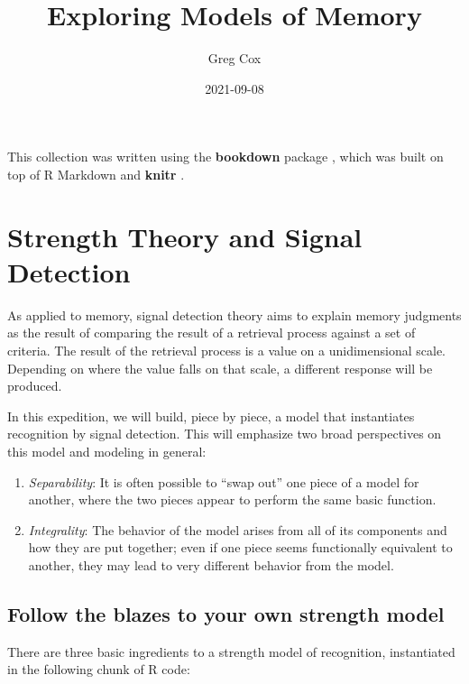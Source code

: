 \documentclass[
]{book}
\title{Exploring Models of Memory}
\author{Greg Cox}
\date{2021-09-08}
\providecommand{\tightlist}{%
  \setlength{\itemsep}{0pt}\setlength{\parskip}{0pt}}
\begin{document}
\maketitle

{
\setcounter{tocdepth}{1}
\tableofcontents
}
This collection was written using the \textbf{bookdown} package \citep{R-bookdown}, which was built on top of R Markdown and \textbf{knitr} \citep{xie2015}.

\hypertarget{sdt}{%
\chapter{Strength Theory and Signal Detection}\label{sdt}}

As applied to memory, signal detection theory aims to explain memory judgments as the result of comparing the result of a retrieval process against a set of criteria. The result of the retrieval process is a value on a unidimensional scale. Depending on where the value falls on that scale, a different response will be produced.

In this expedition, we will build, piece by piece, a model that instantiates recognition by signal detection. This will emphasize two broad perspectives on this model and modeling in general:

\begin{enumerate}
\def\labelenumi{\arabic{enumi}.}
\tightlist
\item
  \emph{Separability}: It is often possible to ``swap out'' one piece of a model for another, where the two pieces appear to perform the same basic function.
\item
  \emph{Integrality}: The behavior of the model arises from all of its components and how they are put together; even if one piece seems functionally equivalent to another, they may lead to very different behavior from the model.
\end{enumerate}

\hypertarget{follow-the-blazes-to-your-own-strength-model}{%
\section{Follow the blazes to your own strength model}\label{follow-the-blazes-to-your-own-strength-model}}

There are three basic ingredients to a strength model of recognition, instantiated in the following chunk of R code:
\end{document}
